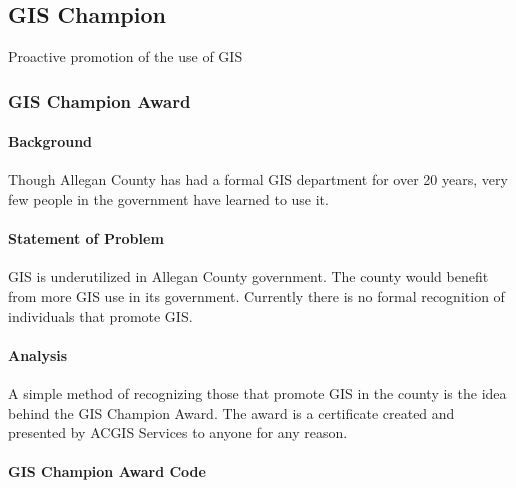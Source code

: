 \documentclass[class=book , crop=false]{standalone}
\title{}  %
\begin{document}

\ifstandalone
\maketitle %
\tableofcontents %
\clearpage
\fi
\subsection{GIS Champion}
\noindent Proactive promotion of the use of GIS
\subsubsection{GIS Champion Award}
\begin{multicols}{2}
%
\paragraph{Background}
%
\noindent Though Allegan County has had a formal GIS department for over 20 years, very few people in the government have learned to use it.
\paragraph{Statement of Problem}
\noindent GIS is underutilized in Allegan County government.  The county would benefit from more GIS use in its government.  Currently there is no formal recognition of individuals that promote GIS.
\paragraph{Analysis}
\noindent A simple method of recognizing those that promote GIS in the county is the idea behind the GIS Champion Award.  The award is a certificate created and presented by ACGIS Services to anyone for any reason.
\end{multicols}
\clearpage
\paragraph{GIS Champion Award Code}
\vspace{.2in}
\end{document}
